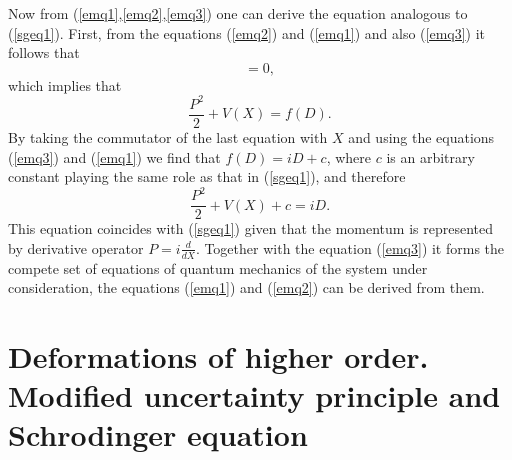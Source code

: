 \documentclass[a4paper,11pt]{article}
\begin{document}
Now from (\ref{emq1},\ref{emq2},\ref{emq3}) one can derive the
equation analogous to (\ref{sgeq1}). First, from the equations
(\ref{emq2}) and (\ref{emq1}) and also (\ref{emq3}) it follows
that
\begin{equation}
[\frac{P^2}{2}+V(X),D]=0, \label{enco}
\end{equation}
which implies that
\begin{equation}
\frac{P^2}{2}+V(X)=f(D).
\end{equation}
By taking the commutator of the last equation with $X$ and using
the equations (\ref{emq3}) and (\ref{emq1}) we find that
$f(D)=iD+c$, where $c$ is an arbitrary constant playing the same
role as that in (\ref{sgeq1}), and therefore
\begin{equation}
\frac{P^2}{2}+V(X)+c=iD. \label{sgeq2}
\end{equation}
This equation coincides with (\ref{sgeq1}) given that the momentum
is represented by derivative operator $P=i\frac{d}{dX}$. Together
with the equation (\ref{emq3}) it forms the compete set of
equations of quantum mechanics of the system under consideration,
the equations (\ref{emq1}) and (\ref{emq2}) can be derived from
them.


\section{Deformations of higher order. Modified uncertainty principle and Schrodinger equation  }
\label{sec4}
\end{document}
